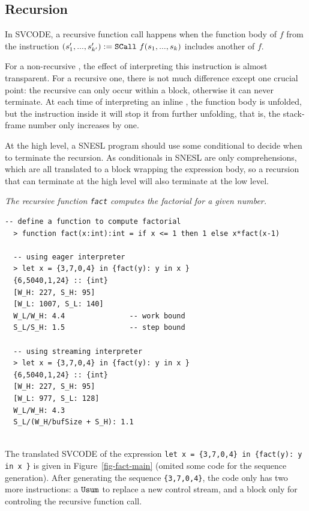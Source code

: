 \subsection{Recursion}

In SVCODE, a recursive function call happens when the function body of $f$ from the instruction $\scall{f}{s_1,...,s_k}{(s_1',...,s'_{k'})}$ includes another \sc of  $f$.


For a non-recursive \sc, the effect of interpreting this instruction is almost transparent. 
For a recursive one, there is not much difference except one crucial point: the recursive \sc can only occur within a \wc block, otherwise it can never terminate.
At each time of interpreting an inline \sc, the function body is unfolded, but the \wc instruction inside it will stop it from further unfolding, that is, the stack-frame number only increases by one. 

At the high level, a SNESL program should use some conditional to decide when to terminate the recursion. 
As conditionals in SNESL are only comprehensions, which are all translated to a \wc block wrapping the expression body,
so a recursion that can terminate at the high level will also terminate at the low level. 


\begin{example} \emph{The recursive function \texttt{fact} computes the factorial for a given number.}
\end{example}
\begin{lstlisting}[style=nesl-style]
  -- define a function to compute factorial
  > function fact(x:int):int = if x <= 1 then 1 else x*fact(x-1)
   
  -- using eager interpreter 
  > let x = {3,7,0,4} in {fact(y): y in x }
  {6,5040,1,24} :: {int}     
  [W_H: 227, S_H: 95]        
  [W_L: 1007, S_L: 140]      
  W_L/W_H: 4.4               -- work bound
  S_L/S_H: 1.5               -- step bound
  
  -- using streaming interpreter
  > let x = {3,7,0,4} in {fact(y): y in x }
  {6,5040,1,24} :: {int}     
  [W_H: 227, S_H: 95]       
  [W_L: 977, S_L: 128]      
  W_L/W_H: 4.3            
  S_L/(W_H/bufSize + S_H): 1.1
\end{lstlisting}

\hspace{1cm}\\
The translated SVCODE of the expression \texttt{let x = \{3,7,0,4\} in \{fact(y): y in x \}} is given in Figure~\ref{fig-fact-main} (omited some code for the sequence generation). After generating the sequence \texttt{\{3,7,0,4\}}, 
the code only has two more instructions: a $\usum$ to replace a new control stream, and a \wc block only for controling the recursive function call. 

